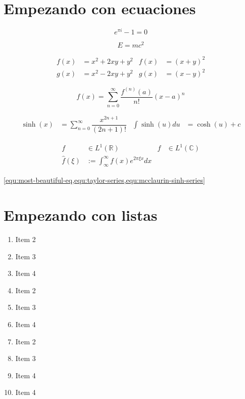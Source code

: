 \documentclass[12pt]{report}
\begin{document}
	\chapter{Empezando con ecuaciones}
		
		\lipsum[1]
		
		
		
		\begin{equation}\label{equ:most-beautiful-eq}
			e^{\pi i} -1 = 0
		\end{equation}
		
		\begin{equation}\label{equ:einstein}
			E = m c^{2}
		\end{equation}
		
		\lipsum[1][1-3]
		
		\begin{align}
			f(x) &= x^{2} + 2xy + y^{2} &
				f(x) &= (x+y)^{2} \\
			g(x) &= x^{2} - 2xy + y^{2} &
				g(x) &= (x-y)^{2}
		\end{align}
		\clearpage
		
		\begin{equation}\label{equ:taylor-series}
			f(x) = \sum_{n=0}^{\infty}{
				\dfrac{f^{(n)}(a)}{n!}(x-a)^{n}
			}
		\end{equation}		
		
		\begin{align} \label{equ:mcclaurin-sinh-series}
			\sinh(x) &= \sum_{n=0}^{\infty}{\dfrac{x^{2n+1}}{(2n+1)!}} &
				\int \sinh(u) du &= \cosh(u) + c
		\end{align}
		
		\begin{align*}
			f &\in L^{1}(\mathbb{R}) & f &\in L^{1}(\mathbb{C})\\
			\hat{f}(\xi) &:= \int_{\infty}^{\infty} f(x) e ^{2\pi\xi x} dx
		\end{align*}
		
		\cref{equ:most-beautiful-eq,equ:taylor-series,equ:mcclaurin-sinh-series}
		
	\chapter{Empezando con listas}
		
		\begin{enumerate}[columns=4]
			\item Item 2
			\item Item 3
			\item Item 4
			\item Item 2
			\item Item 3
			\item Item 4
			\item Item 2
			\item Item 3
			\item Item 4
			\item Item 4
		\end{enumerate}
		
		\lipsum[1][1] \cites{nadeeshani_nicotinamide_2022}{kalogirou_solar_2004}
				
	\printbibliography[heading=bibintoc]
\end{document}
